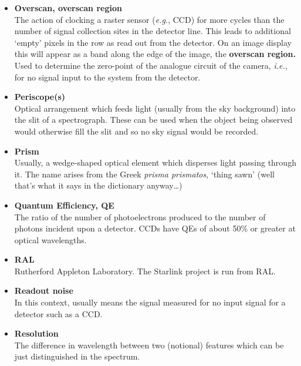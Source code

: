 \documentclass[twoside,11pt]{starlink}
\begin{document}
\begin{itemize}
\item {\bf\label{gl_overscan}Overscan, overscan region}\\
      The action of clocking a raster sensor ({\em{e.g.}}, CCD) for more
      cycles than the number of signal collection sites in the
      detector line.  This leads to additional `empty' pixels in the
      row as read out from the detector.  On an image display this
      will appear as a band along the edge of the image, the \textbf{overscan region.}  Used to determine the zero-point of the
      analogue circuit of the camera, \emph{i.e.}, for no signal input
      to the system from the detector.

\item {\bf\label{gl_periscopes}Periscope(s)}\\
      Optical arrangement which feeds light (usually from the sky
      background) into the slit of a spectrograph.  These can be used
      when the object being observed would otherwise fill the slit
      and so no sky signal would be recorded.

\item {\bf\label{gl_prism}Prism}\\
      Usually, a wedge-shaped optical element which disperses light
      passing through it.  The name arises from the Greek {\sl prisma
      prismatos}, `thing sawn' (well that's what it says in the
      dictionary anyway\ldots)

\item {\bf\label{gl_qe}Quantum Efficiency, QE}\\
      The ratio of the number of photoelectrons produced to the number
      of photons incident upon a detector.  CCDs have QEs of about
      50\% or greater at optical wavelengths.

\item {\bf\label{gl_ral}RAL}\\
      Rutherford Appleton Laboratory.
      The Starlink project is run from RAL.

\item {\bf\label{gl_readout_noise}Readout noise}\\
      In this context, usually means the signal measured for no input
      signal for a detector such as a CCD.

\item {\bf\label{gl_resolution}Resolution}\\
      The difference in wavelength between two (notional) features
      which can be just distinguished in the spectrum.


\end{itemize}
\end{document}
